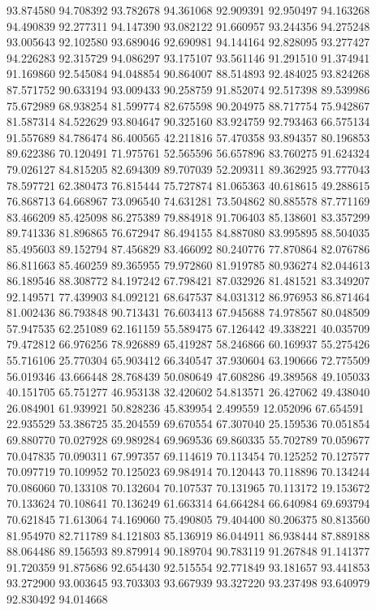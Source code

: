 93.874580
94.708392
93.782678
94.361068
92.909391
92.950497
94.163268
94.490839
92.277311
94.147390
93.082122
91.660957
93.244356
94.275248
93.005643
92.102580
93.689046
92.690981
94.144164
92.828095
93.277427
94.226283
92.315729
94.086297
93.175107
93.561146
91.291510
91.374941
91.169860
92.545084
94.048854
90.864007
88.514893
92.484025
93.824268
87.571752
90.633194
93.009433
90.258759
91.852074
92.517398
89.539986
75.672989
68.938254
81.599774
82.675598
90.204975
88.717754
75.942867
81.587314
84.522629
93.804647
90.325160
83.924759
92.793463
66.575134
91.557689
84.786474
86.400565
42.211816
57.470358
93.894357
80.196853
89.622386
70.120491
71.975761
52.565596
56.657896
83.760275
91.624324
79.026127
84.815205
82.694309
89.707039
52.209311
89.362925
93.777043
78.597721
62.380473
76.815444
75.727874
81.065363
40.618615
49.288615
76.868713
64.668967
73.096540
74.631281
73.504862
80.885578
87.771169
83.466209
85.425098
86.275389
79.884918
91.706403
85.138601
83.357299
89.741336
81.896865
76.672947
86.494155
84.887080
83.995895
88.504035
85.495603
89.152794
87.456829
83.466092
80.240776
77.870864
82.076786
86.811663
85.460259
89.365955
79.972860
81.919785
80.936274
82.044613
86.189546
88.308772
84.197242
67.798421
87.032926
81.481521
83.349207
92.149571
77.439903
84.092121
68.647537
84.031312
86.976953
86.871464
81.002436
86.793848
90.713431
76.603413
67.945688
74.978567
80.048509
57.947535
62.251089
62.161159
55.589475
67.126442
49.338221
40.035709
79.472812
66.976256
78.926889
65.419287
58.246866
60.169937
55.275426
55.716106
25.770304
65.903412
66.340547
37.930604
63.190666
72.775509
56.019346
43.666448
28.768439
50.080649
47.608286
49.389568
49.105033
40.151705
65.751277
46.953138
32.420602
54.813571
26.427062
49.438040
26.084901
61.939921
50.828236
45.839954
2.499559
12.052096
67.654591
22.935529
53.386725
35.204559
69.670554
67.307040
25.159536
70.051854
69.880770
70.027928
69.989284
69.969536
69.860335
55.702789
70.059677
70.047835
70.090311
67.997357
69.114619
70.113454
70.125252
70.127577
70.097719
70.109952
70.125023
69.984914
70.120443
70.118896
70.134244
70.086060
70.133108
70.132604
70.107537
70.131965
70.113172
19.153672
70.133624
70.108641
70.136249
61.663314
64.664284
66.640984
69.693794
70.621845
71.613064
74.169060
75.490805
79.404400
80.206375
80.813560
81.954970
82.711789
84.121803
85.136919
86.044911
86.938444
87.889188
88.064486
89.156593
89.879914
90.189704
90.783119
91.267848
91.141377
91.720359
91.875686
92.654430
92.515554
92.771849
93.181657
93.441853
93.272900
93.003645
93.703303
93.667939
93.327220
93.237498
93.640979
92.830492
94.014668
